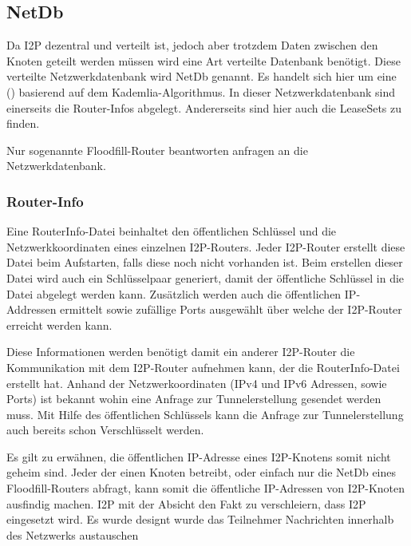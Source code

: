 \subsection{NetDb}\label{sec:netdb}

Da I2P dezentral und verteilt ist, jedoch aber trotzdem Daten zwischen den Knoten geteilt werden müssen wird eine Art verteilte Datenbank benötigt.
Diese verteilte Netzwerkdatenbank wird NetDb genannt.
Es handelt sich hier um eine  () basierend auf dem Kademlia-Algorithmus.
In dieser Netzwerkdatenbank sind einerseits die Router-Infos abgelegt.
Andererseits sind hier auch die LeaseSets zu finden.
\parencite{author_network_nodate}

Nur sogenannte Floodfill-Router beantworten anfragen an die Netzwerkdatenbank.
\parencite[S.~5-6]{timpanaro_monitoring_nodate}

\subsubsection{Router-Info}\label{sec:router_info}

Eine RouterInfo-Datei beinhaltet den öffentlichen Schlüssel und die Netzwerkkoordinaten eines einzelnen I2P-Routers.
Jeder I2P-Router erstellt diese Datei beim Aufstarten, falls diese noch nicht vorhanden ist.
Beim erstellen dieser Datei wird auch ein Schlüsselpaar generiert, damit der öffentliche Schlüssel in die Datei abgelegt werden kann.
Zusätzlich werden auch die öffentlichen IP-Addressen ermittelt sowie zufällige Ports ausgewählt über welche der I2P-Router erreicht werden kann.

Diese Informationen werden benötigt damit ein anderer I2P-Router die Kommunikation mit dem I2P-Router aufnehmen kann, der die RouterInfo-Datei erstellt hat.
Anhand der Netzwerkoordinaten (IPv4 und IPv6 Adressen, sowie Ports) ist bekannt wohin eine Anfrage zur Tunnelerstellung gesendet werden muss.
Mit Hilfe des öffentlichen Schlüssels kann die Anfrage zur Tunnelerstellung auch bereits schon Verschlüsselt werden. 

Es gilt zu erwähnen, die öffentlichen IP-Adresse eines I2P-Knotens somit nicht geheim sind.
Jeder der einen Knoten betreibt, oder einfach nur die NetDb eines Floodfill-Routers abfragt, kann somit die öffentliche IP-Adressen von I2P-Knoten ausfindig machen.
I2P mit der Absicht den Fakt zu verschleiern, dass I2P eingesetzt wird. Es wurde designt wurde das Teilnehmer Nachrichten innerhalb des Netzwerks austauschen 

